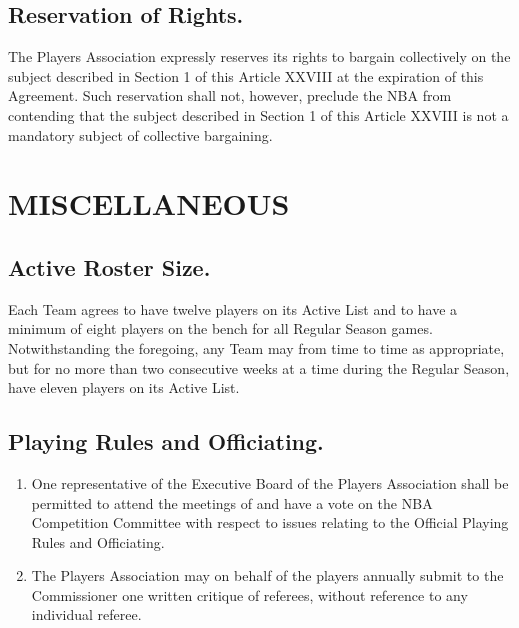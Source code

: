 \documentclass[
]{book}
\providecommand{\tightlist}{%
  \setlength{\itemsep}{0pt}\setlength{\parskip}{0pt}}
\begin{document}
\hypertarget{reservation-of-rights.}{%
\section{Reservation of Rights.}\label{reservation-of-rights.}}

The Players Association expressly reserves its rights to bargain collectively on the subject described in Section 1 of this Article XXVIII at the expiration of this Agreement. Such reservation shall not, however, preclude the NBA from contending that the subject described in Section 1 of this Article XXVIII is not a mandatory subject of collective bargaining.

\hypertarget{miscellaneous}{%
\chapter{MISCELLANEOUS}\label{miscellaneous}}

\hypertarget{active-roster-size.}{%
\section{Active Roster Size.}\label{active-roster-size.}}

Each Team agrees to have twelve players on its Active List and to have a minimum of eight players on the bench for all Regular Season games. Notwithstanding the foregoing, any Team may from time to time as appropriate, but for no more than two consecutive weeks at a time during the Regular Season, have eleven players on its Active List.

\hypertarget{playing-rules-and-officiating.}{%
\section{Playing Rules and Officiating.}\label{playing-rules-and-officiating.}}

\begin{enumerate}
\def\labelenumi{(\alph{enumi})}
\tightlist
\item
  One representative of the Executive Board of the Players Association shall be permitted to attend the meetings of and have a vote on the NBA Competition Committee with respect to issues relating to the Official Playing Rules and Officiating.
\item
  The Players Association may on behalf of the players annually submit to the Commissioner one written critique of referees, without reference to any individual referee.
\end{enumerate}
\end{document}
